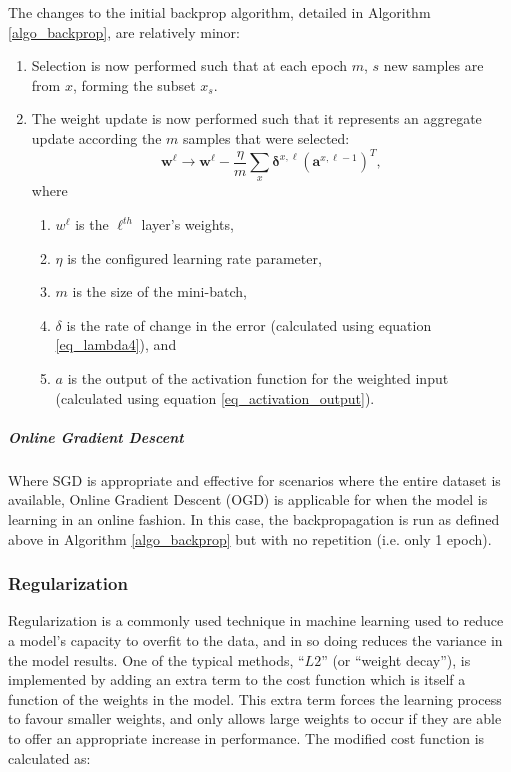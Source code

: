 \documentclass[a4paper,11pt,oneside]{article}
\theoremstyle{plain}
\theoremstyle{definition}
\begin{document}
	The changes to the initial backprop algorithm, detailed in Algorithm \ref{algo_backprop}, are relatively minor:
	\begin{enumerate}
		\item Selection is now performed such that at each epoch $m$, $s$ new samples are from $x$, forming the subset $x_s$.
		\item The weight update is now performed such that it represents an aggregate update according the $m$ samples that were selected:
		\begin{equation}\label{eq_backprop_weightupdate_sgd}
		\mathbf{w}^\ell \rightarrow \mathbf{w}^\ell - \frac{\eta}{m} \sum_{x} \mathbf{\delta}^{x, \ell} (\mathbf{a}^{x, \ell - 1})^T , 
		\end{equation}
		where
		\begin{enumerate}
			\item $w^\ell$ is the $\ell^{th}$ layer's weights,
			\item $\eta$ is the configured learning rate parameter, 
			\item $m$ is the size of the mini-batch,
			\item $\delta$ is the rate of change in the error (calculated using equation \eqref{eq_lambda4}), and
			\item $a$ is the output of the activation function for the weighted input (calculated using equation \eqref{eq_activation_output}).
		\end{enumerate}
	\end{enumerate}
	
	\subparagraph{Online Gradient Descent}
	Where SGD is appropriate and effective for scenarios where the entire dataset is available, Online Gradient Descent (OGD) is applicable for when the model is learning in an online fashion. In this case, the backpropagation is run as defined above in Algorithm \ref{algo_backprop} but with no repetition (i.e. only 1 epoch).
	
	\subsubsection{Regularization}\label{imp_regularization}
	
	Regularization is a commonly used technique in machine learning used to reduce a model's capacity to overfit to the data, and in so doing reduces the variance in the model results. One of the typical methods, ``$L2$'' (or ``weight decay''), is implemented by adding an extra term to the cost function which is itself a function of the weights in the model. This extra term forces the learning process to favour smaller weights, and only allows large weights to occur if they are able to offer an appropriate increase in performance. The modified cost function is calculated as:
	
\end{document}
